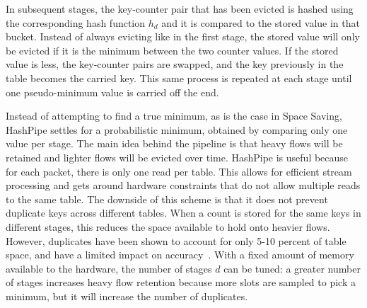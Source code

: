 In subsequent stages, the key-counter pair that has been evicted is hashed using the corresponding hash function $h_d$ and it is compared to the stored value in that bucket. Instead of always evicting like in the first stage, the stored value will only be evicted if it is the minimum between the two counter values. If the stored value is less, the key-counter pairs are swapped, and the key previously in the table becomes the carried key. This same process is repeated at each stage until one pseudo-minimum value is carried off the end.

Instead of attempting to find a true minimum, as is the case in Space Saving, HashPipe settles for a probabilistic minimum, obtained by comparing only one value per stage. The main idea behind the pipeline is that heavy flows will be retained and lighter flows will be evicted over time. HashPipe is useful because for each packet, there is only one read per table. This allows for efficient stream processing and gets around hardware constraints that do not allow multiple reads to the same table. The downside of this scheme is that it does not prevent duplicate keys across different tables. When a count is stored for the same keys in different stages, this reduces the space available to hold onto heavier flows. However, duplicates have been shown to account for only 5-10 percent of table space, and have a limited impact on accuracy~\cite{hashpipe}. With a fixed amount of memory available to the hardware, the number of stages $d$ can be tuned: a greater number of stages increases heavy flow retention because more slots are sampled to pick a minimum, but it will increase the number of duplicates.